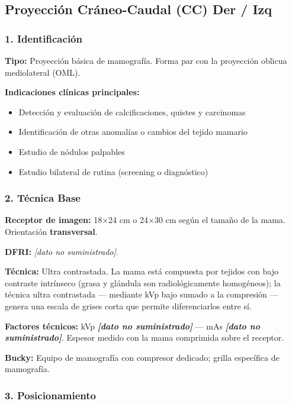 	\subsection{Proyección Cráneo-Caudal (CC) Der / Izq}
	
	\subsubsection*{1. Identificación}
	
	\textbf{Tipo:} Proyección básica de mamografía. Forma par con la proyección oblicua mediolateral (OML).
	
	\textbf{Indicaciones clínicas principales:}
	\begin{itemize}
		\item Detección y evaluación de calcificaciones, quistes y carcinomas
		\item Identificación de otras anomalías o cambios del tejido mamario
		\item Estudio de nódulos palpables
		\item Estudio bilateral de rutina (screening o diagnóstico)
	\end{itemize}
	
	\subsubsection*{2. Técnica Base}
	
	\textbf{Receptor de imagen:} 18×24 cm o 24×30 cm según el tamaño de la mama. Orientación \textbf{transversal}.
	
	\textbf{DFRI:} \textit{[dato no suministrado]}.
	
	\textbf{Técnica:} Ultra contrastada. La mama está compuesta por tejidos con bajo contraste intrínseco (grasa y glándula son radiológicamente homogéneos); la técnica ultra contrastada --- mediante kVp bajo sumado a la compresión --- genera una escala de grises corta que permite diferenciarlos entre sí.
	
	\textbf{Factores técnicos:} kVp \textbf{\textit{[dato no suministrado]}} --- mAs \textbf{\textit{[dato no suministrado]}}. Espesor medido con la mama comprimida sobre el receptor.
	
	\textbf{Bucky:} Equipo de mamografía con compresor dedicado; grilla específica de mamografía.
	
	\subsubsection*{3. Posicionamiento}
	
